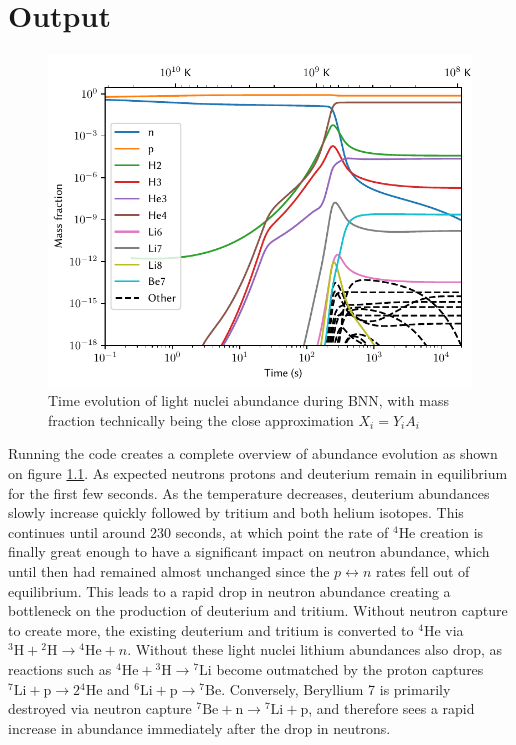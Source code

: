 \chapter{Output}
\label{chap:Results}
\begin{figure}[ht]
    \includegraphics[width=5.1in]{figures/abundancelight.pdf}
    \caption{Time evolution of light nuclei abundance during BNN, with mass fraction technically being the close approximation $X_i=Y_i A_i$ }
    \label{fig:lightXevo}
\end{figure}
Running the code creates a complete overview of abundance evolution as shown on figure \ref{fig:lightXevo}. As expected neutrons protons and deuterium remain in equilibrium for the first few seconds. As the temperature decreases, deuterium abundances slowly increase quickly followed by tritium and both helium isotopes. %
This continues until around 230 seconds, at which point the rate of ${}^4$He creation is finally great enough to have a significant impact on neutron abundance, which until then had remained almost unchanged since the $p\leftrightarrow n$ rates fell out of equilibrium. This leads to a rapid drop in neutron abundance creating a bottleneck on the production of deuterium and tritium. Without neutron capture to create more, the existing deuterium and tritium is converted to ${}^4$He via ${}^3\text{H}+{}^2\text{H}\rightarrow {}^4\text{He}+n$. Without these light nuclei lithium abundances also drop, as reactions such as ${}^4\text{He}+{}^3\text{H}\rightarrow {}^7\text{Li}$ become outmatched by the proton captures ${}^7\text{Li}+\text{p}\rightarrow 2{}^4\text{He}$ and ${}^6\text{Li}+\text{p}\rightarrow {}^7\text{Be}$. Conversely, Beryllium 7 is primarily destroyed via neutron capture ${}^7\text{Be}+\text{n}\rightarrow {}^7\text{Li}+\text{p}$, and therefore sees a rapid increase in abundance immediately after the drop in neutrons.
